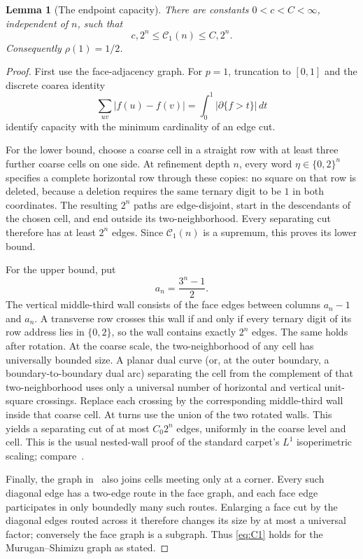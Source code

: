 \documentclass[10pt]{article}
\newtheorem{lemma}[theorem]{Lemma}
\begin{document}
\begin{lemma}[The endpoint capacity]\label{lem:cap1}
There are constants $0<c<C<\infty$, independent of $n$, such that
\begin{equation}\label{eq:C1}
 c,2^n\leq\mathcal C_1(n)\leq C,2^n.
\end{equation}
Consequently $\rho(1)=1/2$.
\end{lemma}

\begin{proof}
First use the face-adjacency graph.  For $p=1$, truncation to $[0,1]$ and
the discrete coarea identity
\[
 \sum_{uv}|f(u)-f(v)|
 =\int_0^1|\partial\{f>t\}|\,dt
\]
identify capacity with the minimum cardinality of an edge cut.

For the lower bound, choose a coarse cell in a straight row with at least
three further coarse cells on one side.  At refinement depth $n$, every
word $\eta\in\{0,2\}^n$ specifies a complete horizontal row through these
copies: no square on that row is deleted, because a deletion requires the
same ternary digit to be $1$ in both coordinates.  The resulting $2^n$
paths are edge-disjoint, start in the descendants of the chosen cell, and
end outside its two-neighborhood.  Every separating cut therefore has at
least $2^n$ edges.  Since $\mathcal C_1(n)$ is a supremum, this proves its
lower bound.

For the upper bound, put
\[
 a_n=\frac{3^n-1}{2}.
\]
The vertical middle-third wall consists of the face edges between columns
$a_n-1$ and $a_n$.  A transverse row crosses this wall if and only if every
ternary digit of its row address lies in $\{0,2\}$, so the wall contains
exactly $2^n$ edges.  The same holds after rotation.  At the coarse scale,
the two-neighborhood of any cell has universally bounded size.  A planar
dual curve (or, at the outer boundary, a boundary-to-boundary dual arc)
separating the cell from the complement of that two-neighborhood uses only
a universal number of horizontal and vertical unit-square crossings.
Replace each crossing by the corresponding middle-third wall inside that
coarse cell.  At turns use the union of the two rotated walls.  This yields
a separating cut of at most $C_0 2^n$ edges, uniformly in the coarse level
and cell.  This is the usual nested-wall proof of the standard carpet's
$L^1$ isoperimetric scaling; compare~\cite{GP,GLC}.

Finally, the graph in~\cite{MS} also joins cells meeting only at a corner.
Every such diagonal edge has a two-edge route in the face graph, and each
face edge participates in only boundedly many such routes.  Enlarging a
face cut by the diagonal edges routed across it therefore changes its size
by at most a universal factor; conversely the face graph is a subgraph.
Thus \eqref{eq:C1} holds for the Murugan--Shimizu graph as stated.
\end{proof}
\end{document}
